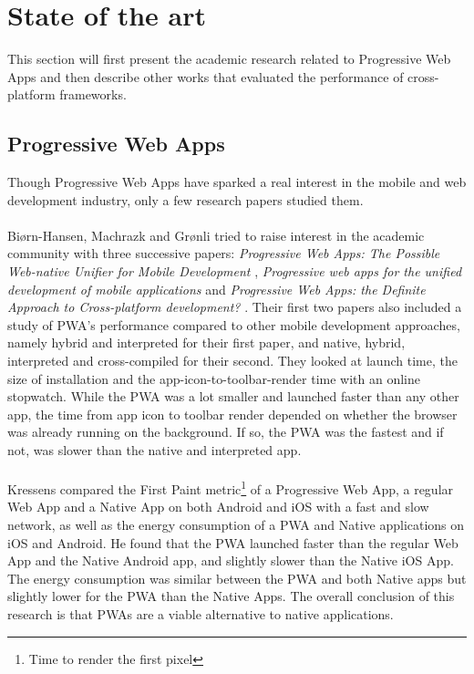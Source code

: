 \documentclass{kththesis}
\begin{document}
\section{State of the art} 

This section will first present the academic research related to Progressive Web Apps and then describe other works that evaluated the performance of cross-platform frameworks.

\subsection{Progressive Web Apps}
Though Progressive Web Apps have sparked a real interest in the mobile and web development industry, only a few research papers studied them\cite{PWApossibleUnifer, Biorn-Hansen2, Biorn-Hansen3}.

\paragraph{}
Biørn-Hansen, Machrazk and Grønli tried to raise interest in the academic community with three successive papers: \textit{Progressive Web Apps: The Possible Web-native Unifier for Mobile Development} \cite{PWApossibleUnifer}, \textit{Progressive web apps for the unified development of mobile applications} \cite{Biorn-Hansen2} and \textit{Progressive Web Apps: the Definite Approach to Cross-platform development?} \cite{Biorn-Hansen3}. Their first two papers also included a study of PWA's performance compared to other mobile development approaches, namely hybrid and interpreted for their first paper, and native, hybrid, interpreted and cross-compiled for their second. They looked at launch time, the size of installation and the app-icon-to-toolbar-render time with an online stopwatch. While the PWA was a lot smaller and launched faster than any other app, the time from app icon to toolbar render depended on whether the browser was already running on the background. If so, the PWA was the fastest and if not, was slower than the native and interpreted app. 

\paragraph{}
Kressens \cite{PWAapplicability} compared the First Paint metric\footnote{Time to render the first pixel}  of a Progressive Web App, a regular Web App and a Native App on both Android and iOS with a fast and slow network, as well as the energy consumption of a PWA and Native applications on iOS and Android. He found that the PWA launched faster than the regular Web App and the Native Android app, and slightly slower than the Native iOS App. The energy consumption was similar between the PWA and both Native apps but slightly lower for the PWA than the Native Apps. The overall conclusion of this research is that PWAs are a viable alternative to native applications.
\end{document}
